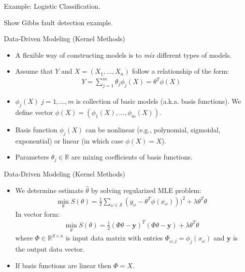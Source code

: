\documentclass[9pt]{beamer}
\begin{document}
%
\begin{frame}{Example: Logistic Classification.}

\begin{block}{}
Show Gibbs fault detection example. 
\end{block}

\end{frame}


\begin{frame}{Data-Driven Modeling (Kernel Methods)}
\begin{itemize}
\item A flexible way of constructing models is to {\em mix} different types of models.  
\item Assume that $Y$ and $X=(X_1,...,X_n)$ follow a relationship of the form:
\begin{align*}
Y=\sum_{j=1}^m\theta_j \phi_j(X)=\theta^T\phi(X)
\end{align*}
\item $\phi_j(X)\; j=1,...,m$ is collection of basic models (a.k.a. basis functions). We define vector $\phi(X)=(\phi_1(X),...,\phi_m(X))$. 
\item Basis function $\phi_j(X)$ can be nonlinear (e.g., polynomial, sigmoidal, exponential) or linear (in which case $\phi(X)=X$). 

\item Parameters $\theta_j\in \mathbb{R}$ are mixing coefficients of basis functions.  

\end{itemize}

\end{frame}


\begin{frame}{Data-Driven Modeling (Kernel Methods)}
\begin{itemize}

\item We determine estimate $\hat{\theta}$ by solving regularized MLE problem:
\begin{align*}
\min_{\theta} S(\theta)= \frac{1}{2}\sum_{\omega \in \mathcal{S}}(y_\omega-\theta^T\phi(x_\omega)))^2+\lambda \theta^T\theta
\end{align*}
In vector form:
\begin{align*}
\min_{\theta} S(\theta)= \frac{1}{2}(\Phi\theta -\mathbf{y})^T(\Phi\theta-\mathbf{y})+\lambda\theta^T\theta
\end{align*}
where $\Phi\in \mathbb{R}^{S\times n}$ is input data matrix with entries $\Phi_{\omega,j}=\phi_{j}(x_\omega)$ and $\mathbf{y}$ is the output data vector. 

\item If basis functions are linear then $\Phi=X$. 

\end{itemize}

\end{frame}
\end{document}
